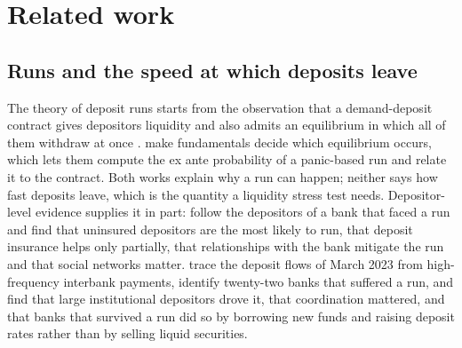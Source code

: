 \section{Related work}
\label{sec:related-work}

\subsection{Runs and the speed at which deposits leave}

The theory of deposit runs starts from the observation that a demand-deposit contract gives depositors liquidity and also admits an equilibrium in which all of them withdraw at once \citep{diamond1983}. \citet{goldsteinpauzner2005} make fundamentals decide which equilibrium occurs, which lets them compute the ex ante probability of a panic-based run and relate it to the contract. Both works explain why a run can happen; neither says how fast deposits leave, which is the quantity a liquidity stress test needs. Depositor-level evidence supplies it in part: \citet{iyerpuri2012} follow the depositors of a bank that faced a run and find that uninsured depositors are the most likely to run, that deposit insurance helps only partially, that relationships with the bank mitigate the run and that social networks matter. \citet{cipriani2024} trace the deposit flows of March 2023 from high-frequency interbank payments, identify twenty-two banks that suffered a run, and find that large institutional depositors drove it, that coordination mattered, and that banks that survived a run did so by borrowing new funds and raising deposit rates rather than by selling liquid securities. %

